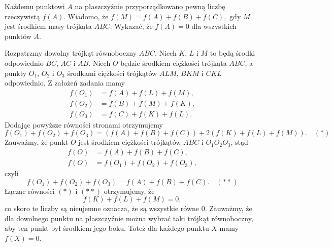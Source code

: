 \newpage
{}

\begin{problem}{1}
	Każdemu punktowi $A$ na płaszczyźnie przyporządkowano pewną liczbę rzeczywistą $f(A).$ Wiadomo, że $f(M) = f(A) + f(B) + f(C),$ gdy $M$ jest środkiem masy trójkąta $ABC.$ Wykazać, że $f(A) = 0$ dla wszystkich punktów $A.$
\end{problem}

\begin{center}
\end{center}

\noindent
Rozpatrzmy dowolny trójkąt równoboczny $ABC$. Niech $K$, $L$ i $M$ to będą środki odpowiednio $BC$, $AC$ i $AB$. Niech $O$ będzie środkiem ciężkości trójkąta $ABC$, a punkty $O_1$, $O_2$ i $O_3$ środkami ciężkości trójkątów $ALM$, $BKM$ i $CKL$ odpowiednio. Z założeń zadania mamy
\begin{align*}
	f(O_1) &= f(A) + f(L) + f(M), \\
	f(O_2) &= f(B) + f(M) + f(K), \\
	f(O_3) &= f(C) + f(K) + f(L).
\end{align*}
Dodając powyższe równości stronami otrzymujemy
\[
	f(O_1) + f(O_2) + f(O_3) = (f(A) + f(B) + f(C)) + 2(f(K) + f(L) + f(M)). \quad (*)
\]
Zauważmy, że punkt $O$ jest środkiem ciężkości trójkątów $ABC$ i $O_1O_2O_3$, stąd
\begin{align*}
	f(O) &= f(A) + f(B) + f(C), \\
	f(O) &= f(O_1) + f(O_2) + f(O_3),
\end{align*}
czyli
\[
	f(O_1) + f(O_2) + f(O_3) = f(A) + f(B) + f(C). \quad (**)
\]
Łącząc równości $(*)$ i $(**)$ otrzymujemy, że
\[
	f(K) + f(L) + f(M) = 0,
\]
co skoro te liczby są nieujemne oznacza, że są wszystkie równe $0$.
Zauważmy, że dla dowolnego punktu na płaszczyźnie można wybrać taki trójkąt równoboczny, aby ten punkt był środkiem jego boku. Toteż dla każdego punktu $X$ mamy $f(X) = 0$.


